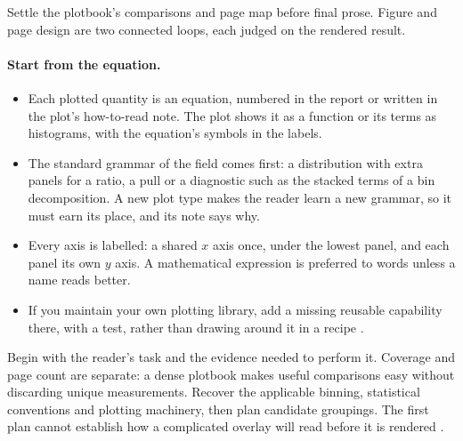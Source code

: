 \begin{headline}
  Settle the plotbook's comparisons and page map before final prose. Figure and page
  design are two connected loops, each judged on the rendered result.
\end{headline}

\paragraph{Start from the equation.}
\begin{itemize}
  \item Each plotted quantity is an equation, numbered in the report or written in the plot's
        how-to-read note. The plot shows it as a function or its terms as histograms, with the
        equation's symbols in the labels.
  \item The standard grammar of the field comes first: a distribution with extra panels for a
        ratio, a pull or a diagnostic such as the stacked terms of a bin decomposition. A new
        plot type makes the reader learn a new grammar, so it must earn its place, and its note
        says why.
  \item Every axis is labelled: a shared $x$ axis once, under the lowest panel, and each panel
        its own $y$ axis. A mathematical expression is preferred to words unless a name reads
        better.
  \item If you maintain your own plotting library, add a missing reusable capability there, with
        a test, rather than drawing around it in a recipe \cite[Design and iterate at two scales;
          Reuse the implementation]{skill:plot-production}.
\end{itemize}

Begin with the reader's task and the evidence needed to perform it. Coverage and page
count are separate: a dense plotbook makes useful comparisons easy without discarding
unique measurements. Recover the applicable binning, statistical conventions and plotting
machinery, then plan candidate groupings. The first plan cannot establish how a
complicated overlay will read before it is rendered \cite[Design and iterate at two
  scales; Reuse the implementation]{skill:plot-production}.

